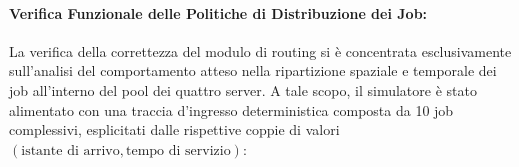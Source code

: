﻿\documentclass[a4paper,12pt]{article}
\begin{document}
\paragraph{Verifica Funzionale delle Politiche di Distribuzione dei Job:}
La verifica della correttezza del modulo di routing si è concentrata esclusivamente sull'analisi del comportamento atteso nella ripartizione spaziale e temporale dei job all'interno del pool dei quattro server. A tale scopo, il simulatore è stato alimentato con una traccia d'ingresso deterministica composta da 10 job complessivi, esplicitati dalle rispettive coppie di valori $(\text{istante di arrivo}, \text{tempo di servizio})$:

\end{document}
